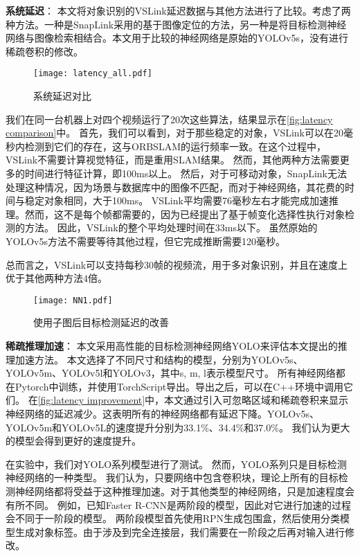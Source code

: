\textbf{系统延迟}：
本文将对象识别的VSLink延迟数据与其他方法进行了比较。考虑了两种方法。一种是SnapLink\cite{chen2018snaplink}采用的基于图像定位的方法，另一种是将目标检测神经网络与图像检索相结合。本文用于比较的神经网络是原始的YOLOv5s\cite{glenn_jocher_2020_4154370}，没有进行稀疏卷积的修改。

\begin{figure}[htbp]
	\centering
	\texttt{[image: latency\_all.pdf]}
	\caption{系统延迟对比}
	\label{fig:latency comparison}
\end{figure}

我们在同一台机器上对四个视频运行了20次这些算法，结果显示在\autoref{fig:latency comparison}中。
首先，我们可以看到，对于那些稳定的对象，VSLink可以在20毫秒内检测到它们的存在，这与ORBSLAM的运行频率一致。在这个过程中，VSLink不需要计算视觉特征，而是重用SLAM结果。
然而，其他两种方法需要更多的时间进行特征计算，即100ms以上。
然后，对于可移动对象，SnapLink无法处理这种情况，因为场景与数据库中的图像不匹配，而对于神经网络，其花费的时间与稳定对象相同，大于100ms。
VSLink平均需要76毫秒左右才能完成加速推理。然而，这不是每个帧都需要的，因为\cite{yao2020video}已经提出了基于帧变化选择性执行对象检测的方法。
因此，VSLink的整个平均处理时间在33ms以下。
虽然原始的YOLOv5s方法不需要等待其他过程，但它完成推断需要120毫秒。
 
总而言之，VSLink可以支持每秒30帧的视频流，用于多对象识别，并且在速度上优于其他两种方法$4$倍。

\begin{figure}[htbp]
	\centering
	\texttt{[image: NN1.pdf]}
	\caption{使用子图后目标检测延迟的改善}
	\label{fig:latency improvement}
\end{figure}

\textbf{稀疏推理加速}：
本文采用高性能的目标检测神经网络YOLO\cite{redmon2016you}来评估本文提出的推理加速方法。
本文选择了不同尺寸和结构的模型，分别为YOLOv5s、YOLOv5m、YOLOv5l和YOLOv3，其中s, m, l表示模型尺寸。
所有神经网络都在Pytorch中训练，并使用TorchScript导出。导出之后，可以在C++环境中调用它们。
在\autoref{fig:latency improvement}中，本文通过引入可忽略区域和稀疏卷积来显示神经网络的延迟减少。这表明所有的神经网络都有延迟下降。YOLOv5s、YOLOv5m和YOLOv5L的速度提升分别为33.1\%、34.4\%和37.0\%。
我们认为更大的模型会得到更好的速度提升。

在实验中，我们对YOLO系列模型进行了测试。
然而，YOLO系列只是目标检测神经网络的一种类型。
我们认为，只要网络中包含卷积块，理论上所有的目标检测神经网络都将受益于这种推理加速。对于其他类型的神经网络，只是加速程度会有所不同。
例如，已知Faster R-CNN是两阶段的模型，因此对它进行加速的过程会不同于一阶段的模型。
两阶段模型首先使用RPN生成包围盒，然后使用分类模型生成对象标签。由于涉及到完全连接层，我们需要在一阶段之后再对输入进行修改。



